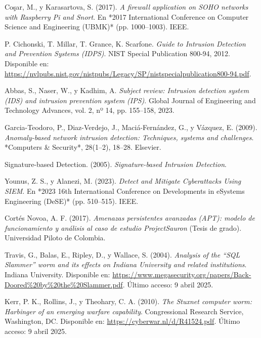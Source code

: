 \documentclass[11pt,a4paper,twoside]{report}
\begin{document}
\begin{thebibliography}{34}
	Coşar, M., y Karasartova, S. (2017). \textit{A firewall application on SOHO networks with Raspberry Pi and Snort}. En *2017 International Conference on Computer Science and Engineering (UBMK)* (pp. 1000--1003). IEEE.
	
	P. Cichonski, T. Millar, T. Grance, K. Scarfone. \textit{Guide to Intrusion Detection and Prevention Systems (IDPS)}. NIST Special Publication 800-94, 2012. Disponible en: \url{https://nvlpubs.nist.gov/nistpubs/Legacy/SP/nistspecialpublication800-94.pdf}.
	
	Abbas, S., Naser, W., y Kadhim, A. \textit{Subject review: Intrusion detection system (IDS) and intrusion prevention system (IPS)}. Global Journal of Engineering and Technology Advances, vol. 2, nº 14, pp. 155–158, 2023.
	
	Garcia-Teodoro, P., Diaz-Verdejo, J., Maciá-Fernández, G., y Vázquez, E. (2009). \textit{Anomaly-based network intrusion detection: Techniques, systems and challenges}. *Computers \& Security*, 28(1–2), 18--28. Elsevier.
	
	
	Signature-based Detection. (2005). \textit{Signature-based Intrusion Detection}.
	
	Younus, Z. S., y Alanezi, M. (2023). \textit{Detect and Mitigate Cyberattacks Using SIEM}. En *2023 16th International Conference on Developments in eSystems Engineering (DeSE)* (pp. 510--515). IEEE.
	
	Cortés Novoa, A. F. (2017). \textit{Amenazas persistentes avanzadas (APT): modelo de funcionamiento y análisis al caso de estudio ProjectSauron} (Tesis de grado). Universidad Piloto de Colombia.
	
	Travis, G., Balas, E., Ripley, D., y Wallace, S. (2004). \textit{Analysis of the “SQL Slammer” worm and its effects on Indiana University and related institutions}. Indiana University. Disponible en: \url{https://www.megasecurity.org/papers/Back-Doored%20by%20the%20Slammer.pdf}. Último acceso: 9 abril 2025.
	
	Kerr, P. K., Rollins, J., y Theohary, C. A. (2010). \textit{The Stuxnet computer worm: Harbinger of an emerging warfare capability}. Congressional Research Service, Washington, DC. Disponible en: \url{https://cyberwar.nl/d/R41524.pdf}. Último acceso: 9 abril 2025.
	

\end{thebibliography}
\end{document}
